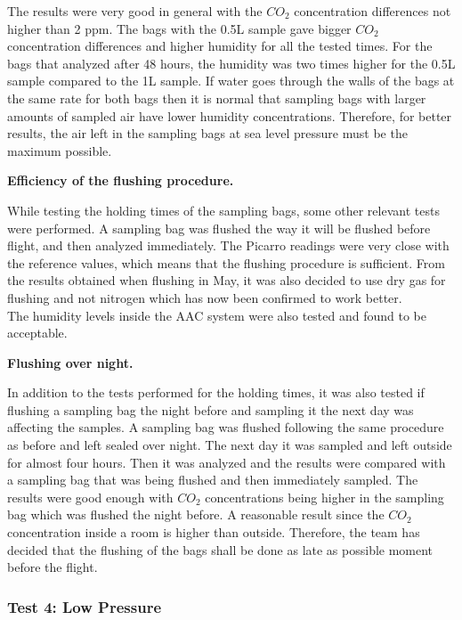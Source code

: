 The results were very good in general with the $CO_2$ concentration differences not higher than 2 ppm. The bags with the 0.5L sample gave bigger $CO_2$ concentration differences and higher humidity for all the tested times. For the bags that analyzed after 48 hours, the humidity was two times higher for the 0.5L sample compared to the 1L sample. If water goes through the walls of the bags at the same rate for both bags then it is normal that sampling bags with larger amounts of sampled air have lower humidity concentrations. Therefore, for better results, the air left in the sampling bags at sea level pressure must be the maximum possible.


\textbf{Efficiency of the flushing procedure.}

While testing the holding times of the sampling bags, some other relevant tests were performed. A sampling bag was flushed the way it will be flushed before flight, and then analyzed immediately. The Picarro readings were very close with the reference values, which means that the flushing procedure is sufficient. From the results obtained when flushing in May, it was also decided to use dry gas for flushing and not nitrogen which has now been confirmed to work better. \\

The humidity levels inside the AAC system were also tested and found to be acceptable. 

\textbf{Flushing over night.}

In addition to the tests performed for the holding times, it was also tested if flushing a sampling bag the night before and sampling it the next day was affecting the samples. A sampling bag was flushed following the same procedure as before and left sealed over night. The next day it was sampled and left outside for almost four hours. Then it was analyzed and the results were compared with a sampling bag that was being flushed and then immediately sampled. The results were good enough with $CO_2$ concentrations being higher in the sampling bag which was flushed the night before. A reasonable result since the $CO_2$ concentration inside a room is higher than outside. Therefore, the team has decided that the flushing of the bags shall be done as late as possible moment before the flight. 

 


\subsubsection{Test 4: Low Pressure}\label{lowpressure}

